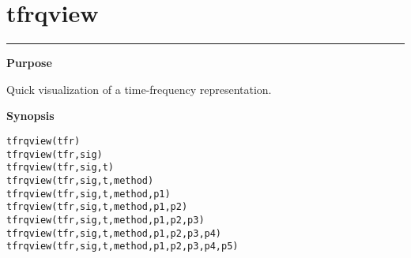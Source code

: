 

\section*{\hspace*{-1.6cm} tfrqview}

\vspace*{-.4cm}
\hspace*{-1.6cm}\rule[0in]{16.5cm}{.02cm}
\vspace*{.2cm}

{\bf \large \sf Purpose}\\
\hspace*{1.5cm}
\begin{minipage}[t]{13.5cm}
Quick visualization of a time-frequency representation.
\end{minipage}
\vspace*{.5cm}

{\bf \large \sf Synopsis}\\
\hspace*{1.5cm}
\begin{minipage}[t]{13.5cm}
\begin{verbatim}
tfrqview(tfr)
tfrqview(tfr,sig)
tfrqview(tfr,sig,t)
tfrqview(tfr,sig,t,method)
tfrqview(tfr,sig,t,method,p1)
tfrqview(tfr,sig,t,method,p1,p2)
tfrqview(tfr,sig,t,method,p1,p2,p3)
tfrqview(tfr,sig,t,method,p1,p2,p3,p4)
tfrqview(tfr,sig,t,method,p1,p2,p3,p4,p5)
\end{verbatim}
\end{minipage}
\vspace*{.5cm}

